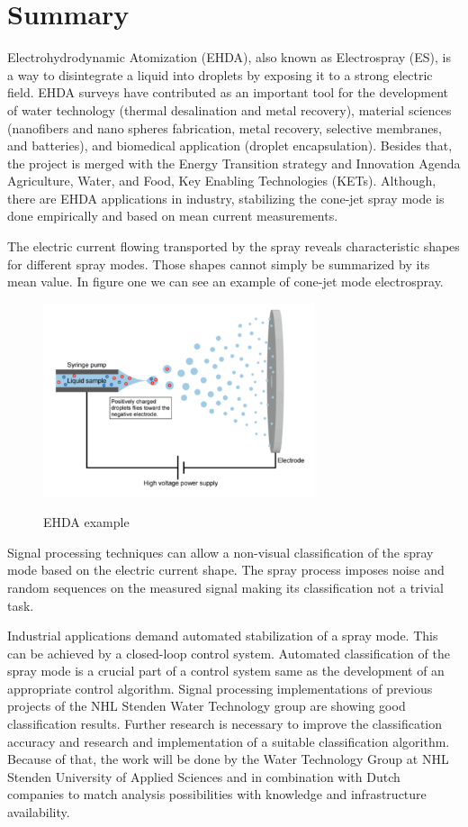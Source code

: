 \section{Summary}

        Electrohydrodynamic Atomization (EHDA), also known as Electrospray (ES), is a way to disintegrate a liquid into droplets by exposing it to a strong electric field.
EHDA surveys have contributed as an important tool for the development of water technology (thermal desalination and metal recovery), material sciences (nanofibers and nano spheres fabrication, metal recovery, selective membranes, and batteries), and biomedical application (droplet encapsulation).
Besides that, the project is merged with the Energy Transition strategy and Innovation Agenda Agriculture, Water, and Food, Key Enabling Technologies (KETs). 
Although, there are EHDA applications in industry, stabilizing the cone-jet spray mode is done empirically and based on mean current measurements. 

The electric current flowing transported by the spray reveals characteristic shapes for different spray modes.
Those shapes cannot simply be summarized by its mean value. In figure one we can see an example of cone-jet mode electrospray.

\begin{figure}[H]
    \center
    \includegraphics[width=8cm]{images/electrospray.png}
    \label{img1}
    \caption{EHDA example}
\end{figure}

Signal processing techniques can allow a non-visual classification of the spray mode based on the electric current shape.
The spray process imposes noise and random sequences on the measured signal making its classification not a trivial task. 

Industrial applications demand automated stabilization of a spray mode.
This can be achieved by a closed-loop control system.
Automated classification of the spray mode is a crucial part of a control system same as the development of an appropriate control algorithm. 
Signal processing implementations of previous projects of the NHL Stenden Water Technology group are showing good classification results.
Further research is necessary to improve the classification accuracy and research and implementation of a suitable classification algorithm. 
Because of that, the work will be done by the Water Technology Group at NHL Stenden University of Applied Sciences and in combination with Dutch companies to match analysis possibilities with knowledge and infrastructure availability.

